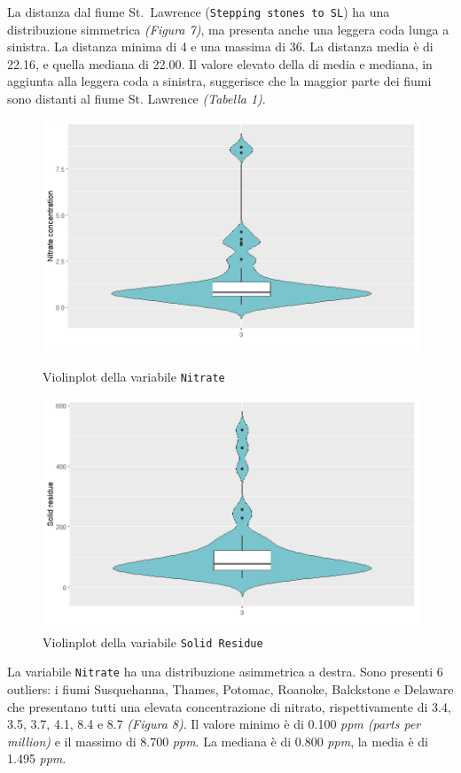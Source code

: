 \documentclass{article} %
\begin{document}
La distanza dal fiume St.\ Lawrence (\texttt{Stepping stones to SL}) ha una distribuzione simmetrica \textit{(Figura 7)}, ma presenta anche una leggera coda lunga a sinistra. La distanza minima di 4 e una massima di 36. La distanza media è di 22.16, e quella mediana di 22.00. Il valore elevato della di media e mediana, in aggiunta alla leggera coda a sinistra, suggerisce che la maggior parte dei fiumi sono distanti al fiume St. Lawrence \textit{(Tabella 1)}.


\begin{figure}[H]
    \centering
    \begin{minipage}{0.49\textwidth}
        \centering
        \includegraphics[width=\textwidth]{immagini/vp_nitrate.png}
        \captionsetup{justification=centering}
        \caption{Violinplot della variabile \texttt{Nitrate}}
    \end{minipage}
    \hfill
    \begin{minipage}{0.49\textwidth}
        \centering
        \includegraphics[width=\textwidth]{immagini/vp_sd.png}
        \captionsetup{justification=centering}
        \caption{Violinplot della variabile \texttt{Solid Residue}}
    \end{minipage}
\end{figure}
La variabile \texttt{Nitrate} ha una distribuzione asimmetrica a destra. Sono presenti 6 outliers: i fiumi Susquehanna, Thames, Potomac, Roanoke, Balckstone e Delaware che presentano tutti una elevata concentrazione di nitrato, rispettivamente di 3.4, 3.5, 3.7, 4.1, 8.4 e 8.7 \textit{(Figura 8)}. Il valore minimo è di 0.100 \textit{ppm (parts per million)} e il massimo di 8.700 \textit{ppm}. La mediana è di 0.800 \textit{ppm}, la media è di 1.495 \textit{ppm}.
\end{document}
